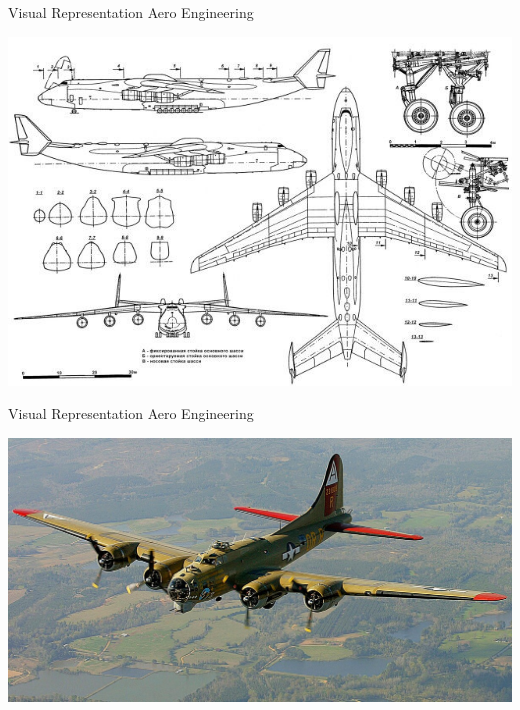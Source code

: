 \documentclass{beamer}
\begin{document}
\begin{frame}[fragile]{Visual Representation}
{Aero Engineering}

\begin{center}
\includegraphics[width=\textwidth]{images/aeroplane-blueprint.jpg}
\end{center}
\end{frame}

\begin{frame}[fragile]{Visual Representation}
{Aero Engineering}

\begin{center}
\includegraphics[width=\textwidth]{images/aeroplane.jpg}
\end{center}
\end{frame}
\end{document}

